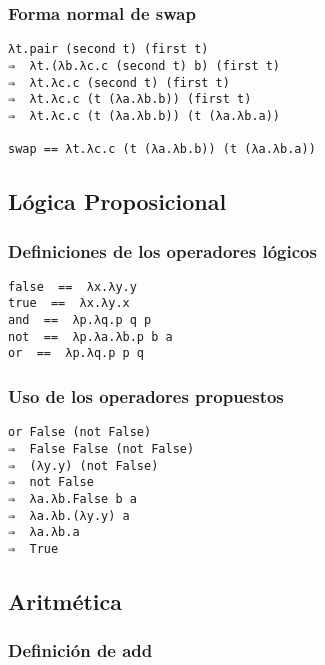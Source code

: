 \documentclass[11pt, spanish]{scrartcl}
\numberwithin{equation}{section} %
\numberwithin{figure}{section} %
\numberwithin{table}{section} %
\begin{document}
\subsubsection{Forma normal de swap}

\begin{lstlisting}[language=Lambda]
λt.pair (second t) (first t)
⇒  λt.(λb.λc.c (second t) b) (first t)
⇒  λt.λc.c (second t) (first t)
⇒  λt.λc.c (t (λa.λb.b)) (first t)
⇒  λt.λc.c (t (λa.λb.b)) (t (λa.λb.a))

swap == λt.λc.c (t (λa.λb.b)) (t (λa.λb.a))
\end{lstlisting}

\subsection{Lógica Proposicional}

\subsubsection{Definiciones de los operadores lógicos}

\begin{lstlisting}[language=Lambda]
false  ==  λx.λy.y	
true  ==  λx.λy.x	
and  ==  λp.λq.p q p	
not  ==  λp.λa.λb.p b a	
or  ==  λp.λq.p p q
\end{lstlisting}

\subsubsection{Uso de los operadores propuestos}

\begin{lstlisting}[language=Lambda]
or False (not False)
⇒  False False (not False)
⇒  (λy.y) (not False)
⇒  not False
⇒  λa.λb.False b a
⇒  λa.λb.(λy.y) a
⇒  λa.λb.a	
⇒  True
\end{lstlisting}

\newpage

\subsection{Aritmética}

\subsubsection{Definición de add}
\end{document}
